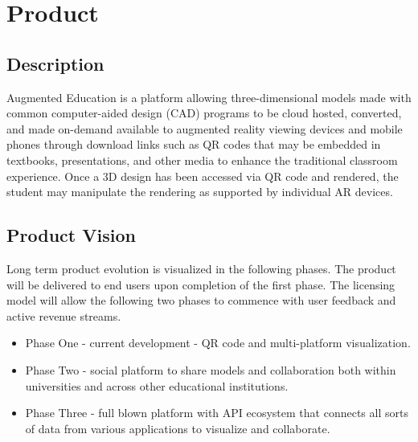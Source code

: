 \section{Product}


\subsection{Description}
Augmented Education is a platform allowing three-dimensional models made with common computer-aided design (CAD) programs to be cloud hosted, converted, and made on-demand available to augmented reality viewing devices and mobile phones through download links such as QR codes that may be embedded in textbooks, presentations, and other media to enhance the traditional classroom experience. Once a 3D design has been accessed via QR code and rendered, the student may manipulate the rendering as supported by individual AR devices. 

\subsection{Product Vision}
Long term product evolution is visualized in the following phases. The product will be delivered to end users upon completion of the first phase. The licensing model will allow the following two phases to commence with user feedback and active revenue streams. 

\begin{itemize}
\item Phase One - current development - QR code and multi-platform visualization.
\item Phase Two - social platform to share models and collaboration both within universities and across other educational institutions.
\item Phase Three - full blown platform with API ecosystem that connects all sorts of data from various applications to visualize and collaborate.
\end{itemize}


